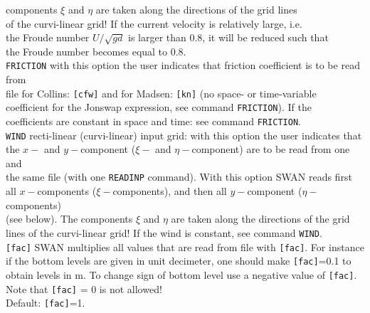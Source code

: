 \documentclass[12pt]{book}
\begin{document}
\begin{tabbing}
                       components  $\xi$ and $\eta$ are taken along the directions of the grid lines\\
                       of the curvi-linear grid! If the current velocity is relatively large, i.e.\\
                       the Froude number $U/ \sqrt{g d}$ is larger than 0.8, it will be reduced such that\\
                       the Froude number becomes equal to 0.8.\-\\
{\tt FRICTION}      \> with this option the user indicates that friction coefficient is to be read from\+\\
                       file for Collins: {\tt [cfw]} and for Madsen: {\tt [kn]} (no space- or time-variable\\
                       coefficient for the Jonswap expression, see command {\tt FRICTION}). If the\\
                       coefficients are constant in space and time: see command {\tt FRICTION}.\-\\
{\tt WIND}          \> recti-linear (curvi-linear) input grid: with this option the user indicates that\+\\
                       the $x-$ and $y-$component ($\xi-$ and $\eta-$component) are to be read from one and\\
                       the same file (with one {\tt READINP} command). With this option SWAN reads first\\
                       all $x-$components ($\xi-$components), and then all $y-$component ($\eta-$components)\\
                       (see below). The components $\xi$ and $\eta$  are taken along the directions of the grid\\
                       lines of the curvi-linear grid! If the wind is constant, see command {\tt WIND}.\-\\
{\tt [fac]}         \> SWAN multiplies all values that are read from file with {\tt [fac]}. For instance\+\\
                       if the bottom levels are given in unit decimeter, one should make {\tt [fac]}=0.1 to\\
                       obtain levels in m. To change sign of bottom level use a negative value of {\tt [fac]}.\\
                       Note that {\tt [fac]} = 0 is not allowed!\\
                       Default: {\tt [fac]}=1.\-\\

\end{tabbing}
\end{document}
